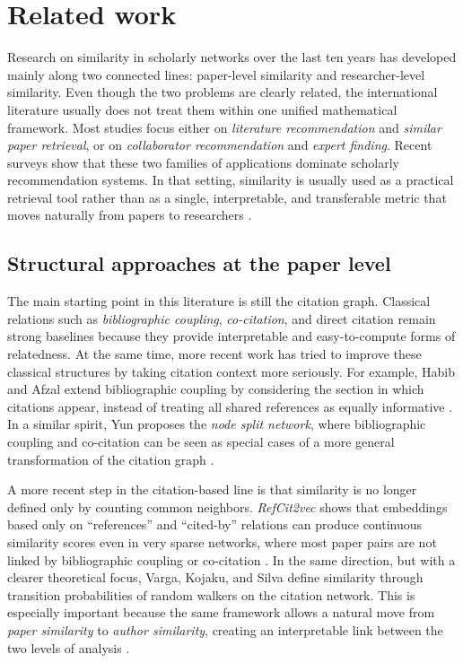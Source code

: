 \documentclass[11pt]{article}
\begin{document}
\section{Related work}

Research on similarity in scholarly networks over the last ten years has developed mainly along two connected lines: paper-level similarity and researcher-level similarity. Even though the two problems are clearly related, the international literature usually does not treat them within one unified mathematical framework. Most studies focus either on \emph{literature recommendation} and \emph{similar paper retrieval}, or on \emph{collaborator recommendation} and \emph{expert finding}. Recent surveys show that these two families of applications dominate scholarly recommendation systems. In that setting, similarity is usually used as a practical retrieval tool rather than as a single, interpretable, and transferable metric that moves naturally from papers to researchers \cite{zhang2023scholarly}.

\subsection{Structural approaches at the paper level}

The main starting point in this literature is still the citation graph. Classical relations such as \emph{bibliographic coupling}, \emph{co-citation}, and direct citation remain strong baselines because they provide interpretable and easy-to-compute forms of relatedness. At the same time, more recent work has tried to improve these classical structures by taking citation context more seriously. For example, Habib and Afzal extend bibliographic coupling by considering the section in which citations appear, instead of treating all shared references as equally informative \cite{habib2019sections}. In a similar spirit, Yun proposes the \emph{node split network}, where bibliographic coupling and co-citation can be seen as special cases of a more general transformation of the citation graph \cite{yun2022nodesplit}.

A more recent step in the citation-based line is that similarity is no longer defined only by counting common neighbors. \emph{RefCit2vec} shows that embeddings based only on ``references'' and ``cited-by'' relations can produce continuous similarity scores even in very sparse networks, where most paper pairs are not linked by bibliographic coupling or co-citation \cite{huang2024refcit2vec}. In the same direction, but with a clearer theoretical focus, Varga, Kojaku, and Silva define similarity through transition probabilities of random walkers on the citation network. This is especially important because the same framework allows a natural move from \emph{paper similarity} to \emph{author similarity}, creating an interpretable link between the two levels of analysis \cite{varga2025transition}.
\end{document}
